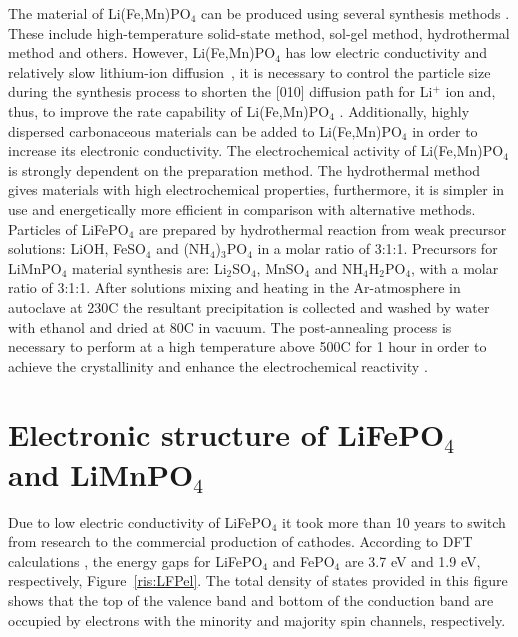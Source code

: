 The material of Li(Fe,Mn)PO$_4$ can be produced using several synthesis methods \cite{wu2015lifepo4}. These include high-temperature solid-state method, sol-gel method, hydrothermal method and others. However, Li(Fe,Mn)PO$_4$ has low electric conductivity and relatively slow lithium-ion diffusion~\cite{padhi1997effect}, it is necessary to control the particle size during the synthesis process to shorten the [010] diffusion path for Li$^+$ ion and, thus, to improve the rate capability of Li(Fe,Mn)PO$_4$ \cite{huang2001approaching}. Additionally, highly dispersed carbonaceous materials can be added to Li(Fe,Mn)PO$_4$ in order to increase its electronic conductivity. The electrochemical activity of Li(Fe,Mn)PO$_4$ is strongly dependent on the preparation method. The hydrothermal method gives materials with high electrochemical properties, furthermore, it is simpler in use and energetically more efficient in comparison with alternative methods. Particles of LiFePO$_4$ are prepared by hydrothermal reaction from weak precursor solutions: LiOH, FeSO$_4$ and (NH$_4$)$_3$PO$_4$ in a molar ratio of 3:1:1. Precursors for LiMnPO$_4$ material synthesis are: Li$_2$SO$_4$, MnSO$_4$ and NH$_4$H$_2$PO$_4$, with a molar ratio of 3:1:1. After solutions mixing and heating in the Ar-atmosphere in autoclave at 230\textdegree C the resultant precipitation is collected and washed by water with ethanol and dried at 80\textdegree C in vacuum. The post-annealing process is necessary to perform at a high temperature above 500\textdegree C for 1 hour in order to achieve the crystallinity and enhance the electrochemical reactivity \cite{shiraishi2005formation}. 

\section{Electronic structure of LiFePO$_4$ and LiMnPO$_4$}

Due to low electric conductivity of LiFePO$_4$ it took more than 10 years to switch from research to the commercial production of cathodes. According to DFT calculations \cite{zaghib2007electronic}, the energy gaps for LiFePO$_4$ and FePO$_4$ are 3.7 eV and 1.9 eV, respectively, Figure~\ref{ris:LFPel}. The total density of states provided in this figure shows that the top of the valence band and bottom of the conduction band are occupied by electrons with the minority and majority spin channels, respectively.

